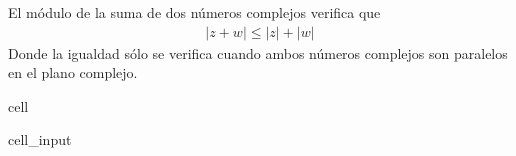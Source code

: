 \documentclass[letterpaper,10pt,english]{jupyterBook}
\begin{document}
\sphinxAtStartPar
El módulo de la suma de dos números complejos verifica que
\begin{equation*}
\begin{split}
| z+w| \leq |z| + |w| 
\end{split}
\end{equation*}
\sphinxAtStartPar
Donde la igualdad sólo se verifica cuando ambos números complejos son paralelos en el plano complejo.

\begin{sphinxuseclass}{cell}\begin{sphinxVerbatimInput}

\begin{sphinxuseclass}{cell_input}
\begin{sphinxVerbatim}[commandchars=\\\{\}]

  

   
  

  




\end{sphinxVerbatim}
\end{sphinxuseclass}
\end{sphinxVerbatimInput}
\end{sphinxuseclass}
\end{document}
